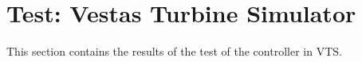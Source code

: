 \section{Test: Vestas Turbine Simulator} \label{sec:test_vts}
This section contains the results of the test of the controller in VTS.